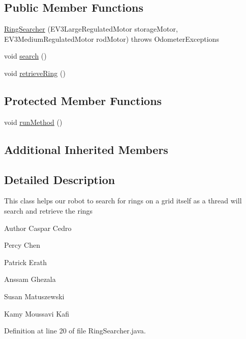 \subsection*{Public Member Functions}
\begin{DoxyCompactItemize}
\item 
\hyperlink{classca_1_1mcgill_1_1ecse211_1_1threads_1_1_ring_searcher_a58fdaba16c2b961446d1474b76e66e49}{Ring\+Searcher} (E\+V3\+Large\+Regulated\+Motor storage\+Motor, E\+V3\+Medium\+Regulated\+Motor rod\+Motor)  throws Odometer\+Exceptions 
\item 
void \hyperlink{classca_1_1mcgill_1_1ecse211_1_1threads_1_1_ring_searcher_abd2b2c172ea393ce4185027c8a12780f}{search} ()
\item 
void \hyperlink{classca_1_1mcgill_1_1ecse211_1_1threads_1_1_ring_searcher_abd7a2651a7c5de76a018664c8bf327af}{retrieve\+Ring} ()
\end{DoxyCompactItemize}
\subsection*{Protected Member Functions}
\begin{DoxyCompactItemize}
\item 
void \hyperlink{classca_1_1mcgill_1_1ecse211_1_1threads_1_1_ring_searcher_a2b03c700b5d232f5aef7c6acf439b7ea}{run\+Method} ()
\end{DoxyCompactItemize}
\subsection*{Additional Inherited Members}


\subsection{Detailed Description}
This class helps our robot to search for rings on a grid itself as a thread will search and retrieve the rings

\begin{DoxyAuthor}{Author}
Caspar Cedro 

Percy Chen 

Patrick Erath 

Anssam Ghezala 

Susan Matuszewski 

Kamy Moussavi Kafi 
\end{DoxyAuthor}


Definition at line 20 of file Ring\+Searcher.\+java.



